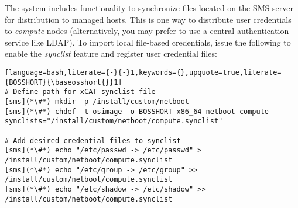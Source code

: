 The \xCAT{} system includes functionality to synchronize files located on the
SMS server for distribution to managed hosts. This is one way to
distribute user credentials to {\em compute} nodes (alternatively, you may
prefer to use a central authentication service like LDAP). To import local file-based
credentials, issue the following to enable the {\em synclist} feature and
register user credential files:

\begin{lstlisting}[language=bash,literate={-}{-}1,keywords={},upquote=true,literate={BOSSHORT}{\baseosshort{}}1]
# Define path for xCAT synclist file
[sms](*\#*) mkdir -p /install/custom/netboot
[sms](*\#*) chdef -t osimage -o BOSSHORT-x86_64-netboot-compute synclists="/install/custom/netboot/compute.synclist"

# Add desired credential files to synclist
[sms](*\#*) echo "/etc/passwd -> /etc/passwd" > /install/custom/netboot/compute.synclist
[sms](*\#*) echo "/etc/group -> /etc/group" >> /install/custom/netboot/compute.synclist
[sms](*\#*) echo "/etc/shadow -> /etc/shadow" >> /install/custom/netboot/compute.synclist
\end{lstlisting}
